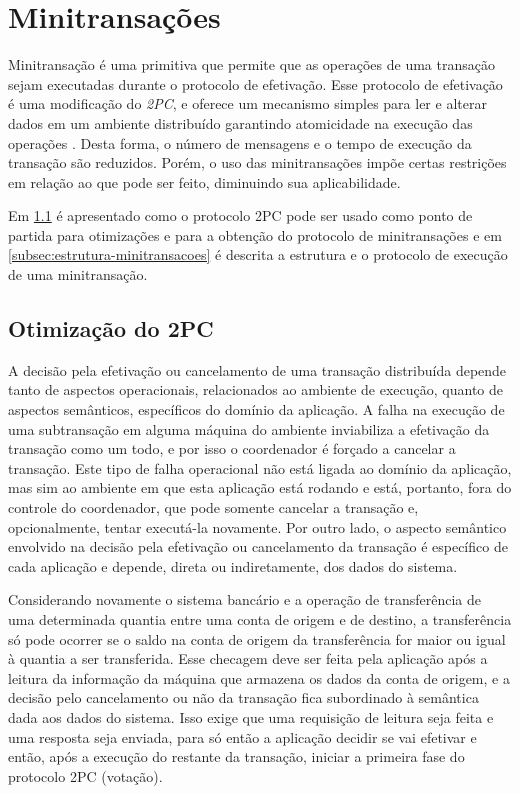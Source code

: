 \documentclass[11pt,twoside,a4paper]{book}
\begin{document}
\section{Minitransações}
\label{sec:minitransacoes}
Minitransação é uma primitiva que permite que as operações de uma transação sejam executadas durante o protocolo de efetivação. Esse protocolo de efetivação é uma modificação do \emph{2PC}, e oferece um mecanismo simples para ler e alterar dados em um ambiente distribuído garantindo atomicidade na execução das operações \cite{sinfonia}. Desta forma, o número de mensagens e o tempo de execução da transação são reduzidos. Porém, o uso das minitransações impõe certas restrições em relação ao que pode ser feito, diminuindo sua aplicabilidade.

Em \ref{subsec:derivando-minitransacoes} é apresentado como o protocolo 2PC pode ser usado como ponto de partida para otimizações e para a obtenção do protocolo de minitransações e em \ref{subsec:estrutura-minitransacoes} é descrita a estrutura e o protocolo de execução de uma minitransação.

\subsection{Otimização do 2PC}
\label{subsec:derivando-minitransacoes}
A decisão pela efetivação ou cancelamento de uma transação distribuída depende tanto de aspectos operacionais, relacionados ao ambiente de execução, quanto de aspectos semânticos, específicos do domínio da aplicação. A falha na execução de uma subtransação em alguma máquina do ambiente inviabiliza a efetivação da transação como um todo, e por isso o coordenador é forçado a cancelar a transação. Este tipo de falha operacional não está ligada ao domínio da aplicação, mas sim ao ambiente em que esta aplicação está rodando e está, portanto, fora do controle do coordenador, que pode somente cancelar a transação e, opcionalmente, tentar executá-la novamente. Por outro lado, o aspecto semântico envolvido na decisão pela efetivação ou cancelamento da transação é específico de cada aplicação e depende, direta ou indiretamente, dos dados do sistema.

Considerando novamente o sistema bancário e a operação de transferência de uma determinada quantia entre uma conta de origem e de destino, a transferência só pode ocorrer se o saldo na conta de origem da transferência for maior ou igual à quantia a ser transferida. Esse checagem deve ser feita pela aplicação após a leitura da informação da máquina que armazena os dados da conta de origem, e a decisão pelo cancelamento ou não da transação fica subordinado à semântica dada aos dados do sistema. Isso exige que uma requisição de leitura seja feita e uma resposta seja enviada, para só então a aplicação decidir se vai efetivar e então, após a execução do restante da transação, iniciar a primeira fase do protocolo 2PC (votação).
\end{document}

